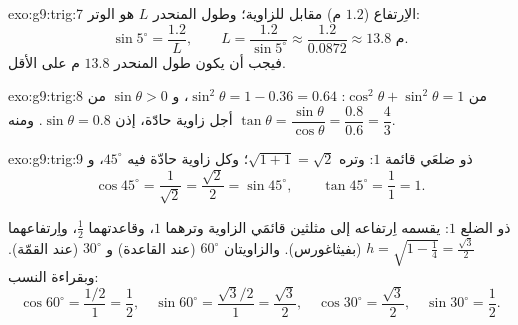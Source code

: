 \begin{solution}{exo:g9:trig:7}
الاِرتفاع ($1.2$ م) مقابل للزاوية؛ وطول المنحدر $L$ هو
الوتر:
\[
\sin 5^\circ = \frac{1.2}{L},
\qquad
L = \frac{1.2}{\sin 5^\circ} \approx \frac{1.2}{0.0872} \approx 13.8
\text{ م}.
\]
فيجب أن يكون طول المنحدر $13.8$ م على الأقل.
\end{solution}

\begin{solution}{exo:g9:trig:8}
من $\cos^2\theta + \sin^2\theta = 1$:
$\sin^2\theta = 1 - 0.36 = 0.64$، و $\sin\theta > 0$ من أجل زاوية
حادّة، إذن $\sin\theta = 0.8$. ومنه
$\tan\theta = \dfrac{\sin\theta}{\cos\theta} = \dfrac{0.8}{0.6} =
\dfrac43$.
\end{solution}

\begin{solution}{exo:g9:trig:9}
\emph{ } ذو ضلعَي قائمة $1$:
وتره $\sqrt{1 + 1} = \sqrt2$؛ وكل زاوية حادّة فيه $45^\circ$، و
\[
\cos 45^\circ = \frac{1}{\sqrt2} = \frac{\sqrt2}{2} = \sin 45^\circ,
\qquad
\tan 45^\circ = \frac11 = 1 .
\]

\emph{} ذو الضلع $1$: يقسمه اِرتفاعه إلى
مثلثين قائمَي الزاوية وترهما $1$، وقاعدتهما $\frac12$،
واِرتفاعهما $h = \sqrt{1 - \frac14} = \frac{\sqrt3}{2}$
(بفيثاغورس). والزاويتان $60^\circ$ (عند القاعدة) و $30^\circ$
(عند القمّة). وبقراءة النسب:
\[
\cos 60^\circ = \frac{1/2}{1} = \frac12, \quad
\sin 60^\circ = \frac{\sqrt3/2}{1} = \frac{\sqrt3}{2}, \quad
\cos 30^\circ = \frac{\sqrt3}{2}, \quad
\sin 30^\circ = \frac12 .
\]
\end{solution}

